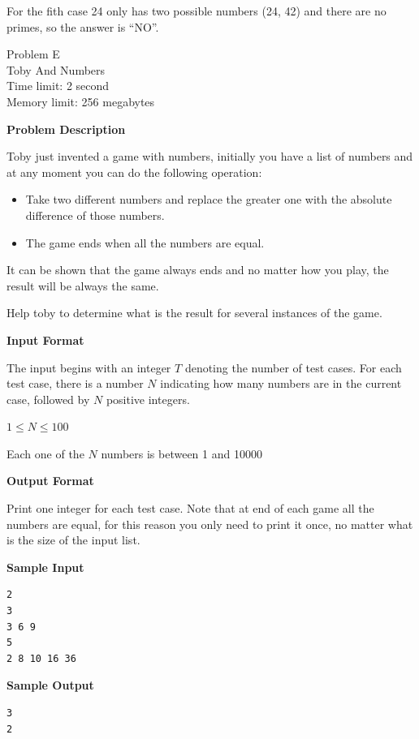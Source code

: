 \documentclass[11pt]{article}
\begin{document}
For the fith case 24 only has two possible numbers (24, 42) and there are no primes, so the
answer is ``NO''.

\newpage
        \begin{center}
            {\LARGE Problem E}\\
            {\Large Toby And Numbers}\\
            {Time limit: 2 second}\\
            {Memory limit: 256 megabytes}
        \end{center}\textbf{\large Problem Description}

Toby just invented a game with numbers, initially you have a list of numbers
and at any moment you can do the following operation:

\begin{itemize}
    \item Take two different numbers and replace the greater one with the absolute
    difference of those numbers.
    \item The game ends when all the numbers are equal.
\end{itemize}

It can be shown that the game always ends and no matter how you play, the result
will be always the same.

Help toby to determine what is the result for several instances of the game.

\textbf{\large Input Format}

The input begins with an integer $T$ denoting the number of test cases. For each
test case, there is a number $N$ indicating how many numbers are in the current case,
followed by $N$ positive integers.

$1 \le N \le 100$

Each one of the $N$ numbers is between 1 and 10000

\textbf{\large Output Format}

Print one integer for each test case. Note that at end of each game all the
numbers are equal, for this reason you only need to print it once, no matter what
is the size of the input list.

\textbf{\large Sample Input}

\begin{verbatim}
2
3
3 6 9
5
2 8 10 16 36
\end{verbatim}

\textbf{\large Sample Output}

\begin{verbatim}
3
2
\end{verbatim}
\end{document}
